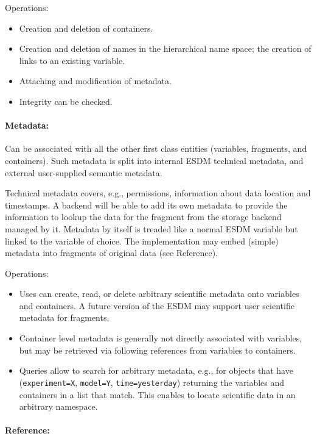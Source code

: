 Operations:

\begin{itemize}
  \item Creation and deletion of containers.
  \item Creation and deletion of names in the hierarchical name space; the creation of links to an existing variable.
  \item Attaching and modification of metadata.
  \item Integrity can be checked.
\end{itemize}

\paragraph{Metadata:}%
\label{metadata-1}

Can be associated with all the other first class entities (variables, fragments, and containers). Such metadata is split into internal ESDM technical metadata, and external user-supplied semantic metadata.

Technical metadata covers, e.g., permissions, information about data location and timestamps.
A backend will be able to add its own metadata to provide the information to lookup the data for the fragment from the storage backend managed by it.
Metadata by itself is treaded like a normal ESDM variable but linked to the variable of choice.
The implementation may embed (simple) metadata into fragments of original data (see Reference).
 
Operations:

\begin{itemize}
  \item Uses can create, read, or delete arbitrary scientific metadata onto variables and containers. A future version of the ESDM may support user scientific metadata for fragments.
  \item Container level metadata is generally not directly associated with variables, but may be retrieved via following references from variables to containers.
  \item Queries allow to search for arbitrary metadata, e.g., for objects that have (\texttt{experiment=X}, \texttt{model=Y}, \texttt{time=yesterday}) returning the variables and containers in a list that match. This enables to locate scientific data in an arbitrary namespace.
\end{itemize}

\paragraph{Reference:}%
\label{reference}

